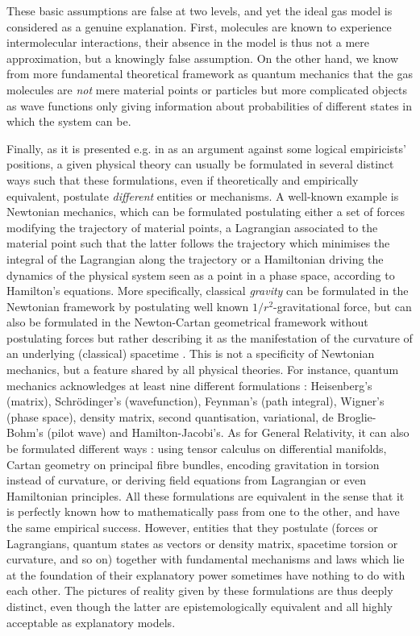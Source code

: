 \documentclass[a4paper,11pt]{article}
\theoremstyle{definition}
\begin{document}
These basic assumptions are false at two levels, and yet the ideal gas model is considered as a genuine explanation. First, molecules are known to experience intermolecular interactions, their absence in the model is thus not a mere approximation, but a knowingly false assumption. On the other hand, we know from more fundamental theoretical framework as quantum mechanics that the gas molecules are \textit{not} mere material points or particles but more complicated objects as wave functions only giving information about probabilities of different states in which the system can be.

Finally, as it is presented e.g. in \citep{Suppe2000} as an argument against some logical empiricists' positions, a given physical theory can usually be formulated in several distinct ways such that these formulations, even if theoretically and empirically equivalent, postulate \textit{different} entities or mechanisms. A well-known example is Newtonian mechanics, which can be formulated postulating either a set of forces modifying the trajectory of material points, a Lagrangian associated to the material point such that the latter follows the trajectory which minimises the integral of the Lagrangian along the trajectory or a Hamiltonian driving the dynamics of the physical system seen as a point in a phase space, according to Hamilton’s equations. More specifically, classical \textit{gravity} can be formulated in the Newtonian framework by postulating well known $1/r^2$-gravitational force, but can also be formulated in the Newton-Cartan geometrical framework without postulating forces but rather describing it as the manifestation of the curvature of an underlying (classical) spacetime \citep[Chapter~1]{Ehlers1973}. This is not a specificity of Newtonian mechanics, but a feature shared by all physical theories. For instance, quantum mechanics acknowledges at least nine different formulations \citep{Styer2002}: Heisenberg's (matrix), Schrödinger's (wavefunction), Feynman's (path integral), Wigner's (phase space), density matrix, second quantisation, variational, de Broglie-Bohm's (pilot wave) and Hamilton-Jacobi's. As for General Relativity, it can also be formulated different ways \citep{Goeckeler2011, Krasnov2020, Arnowitt2008}: using tensor calculus on differential manifolds, Cartan geometry on principal fibre bundles, encoding gravitation in torsion instead of curvature, or deriving field equations from Lagrangian or even Hamiltonian principles. All these formulations are equivalent in the sense that it is perfectly known how to mathematically pass from one to the other, and have the same empirical success. However, entities that they postulate (forces or Lagrangians, quantum states as vectors or density matrix, spacetime torsion or curvature, and so on) together with fundamental mechanisms and laws which lie at the foundation of their explanatory power sometimes have nothing to do with each other. The pictures of reality given by these formulations are thus deeply distinct, even though the latter are epistemologically equivalent and all highly acceptable as explanatory models. 
\end{document}
